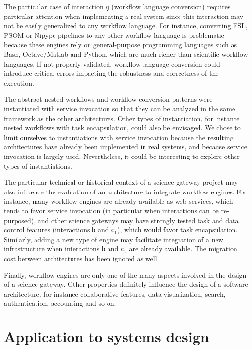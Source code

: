 \documentclass[preprint,3p,twocolumn]{elsarticle}
\newcommand{\correction}[1]{\color{blue}#1\color{black}\xspace}
\begin{document}
The particular case of interaction \texttt{g} (workflow language
conversion) requires particular attention when implementing a real
system since this interaction may not be easily generalized to any
workflow language. For instance, converting FSL, PSOM or Nipype
pipelines to any other workflow language is problematic because these
engines rely on general-purpose programming languages such as Bash,
Octave/Matlab and Python, which are much richer than scientific
workflow languages. \correction{If not properly validated, workflow
  language conversion could introduce critical errors impacting the
  robustness and correctness of the execution. }

The abstract nested workflows and workflow conversion patterns were
instantiated with service invocation so that they can be analyzed in
the same framework as the other architectures. Other types of
instantiation, for instance nested workflows with task encapsulation,
could also be envisaged. We chose to limit ourselves to instantiations
with service invocation because the resulting architectures have already been
implemented in real systems, and because service invocation is largely
used. Nevertheless, it could be interesting to explore other types of
instantiations.

The particular technical or historical context of a science gateway
project may also influence the \correction{evaluation} of an
architecture to integrate workflow engines. For instance, many
workflow engines are already available as web services, which tends to
favor service invocation (\correction{in particular when interactions
  can be re-purposed}), and other science gateways may have strongly
tested task and data control features (interactions \texttt{b} and
\correction{\texttt{c$_1$}}), which would favor task
encapsulation. Similarly, adding a new type of engine may facilitate
integration of a new infrastructure when interactions \texttt{b} and
\texttt{c$_2$} are already available. The migration cost between
architectures has been ignored as well.

Finally, workflow engines are only one of the many aspects involved in
the design of a science gateway. Other properties definitely influence
the design of a software architecture, for instance collaborative
features, data visualization, search, authentication, accounting and
so on.

\correction{\section{Application to systems design}}
\label{sec:application}
\end{document}
